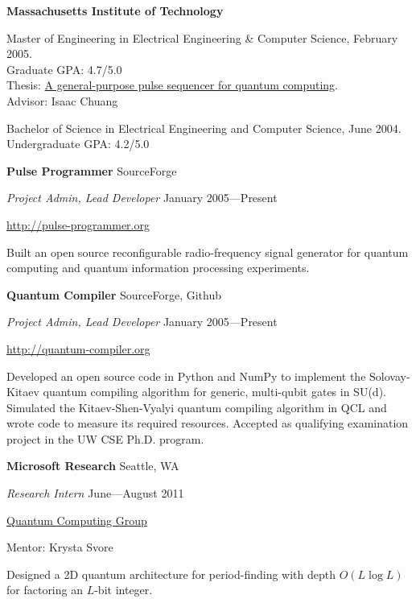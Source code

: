 \documentclass[letter]{article}
\begin{document}
{\bf Massachusetts Institute of Technology}
\par
Master of Engineering in Electrical Engineering \& Computer Science, February 2005.\\
Graduate GPA: 4.7/5.0\\
Thesis: \href{http://sourceforge.net/project/showfiles.php?group_id=129764&package_id=144780&release_id=307201}{A general-purpose pulse sequencer for quantum computing}.\\
Advisor: Isaac Chuang\\
\par
Bachelor of Science in Electrical Engineering and Computer Science, June 2004.\\
Undergraduate GPA: 4.2/5.0
\vspace{\baselineskip}
\par

{\bf {Pulse Programmer}} \hfill SourceForge
\par
{\em Project Admin, Lead Developer} \hfill January 2005---Present
\par
\url{http://pulse-programmer.org}
\par
Built an open source reconfigurable radio-frequency signal generator
for quantum computing and quantum information processing experiments.

\vspace{\baselineskip}
\par
{\bf {Quantum Compiler}} \hfill SourceForge, Github
\par
{\em Project Admin, Lead Developer} \hfill January 2005---Present
\par
\url{http://quantum-compiler.org}
\par
Developed an open source code in Python and NumPy to implement the
Solovay-Kitaev quantum compiling algorithm for generic, multi-qubit gates
in SU(d). Simulated the Kitaev-Shen-Vyalyi quantum compiling algorithm in
QCL and wrote code to measure its required resources. Accepted as
qualifying examination project in the UW CSE Ph.D. program.

\vspace{\baselineskip}
\par
{\bf {Microsoft Research}} \hfill Seattle, WA
\par
{\em Research Intern} \hfill June---August 2011
\par
\href{http://research.microsoft.com/en-us/projects/Quantum/}{Quantum Computing Group}
\par
Mentor: Krysta Svore
\par
Designed a 2D quantum architecture for period-finding with depth $O(L \log L)$
for factoring an $L$-bit integer.
\end{document}
